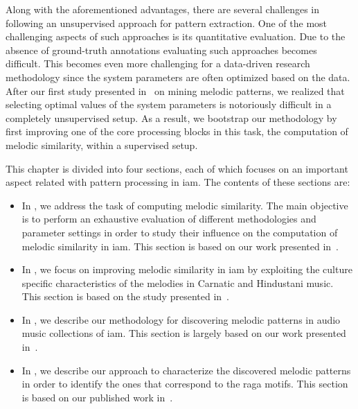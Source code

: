 Along with the aforementioned advantages, there are several challenges in following an unsupervised approach for pattern extraction. One of the most challenging aspects of such approaches is its quantitative evaluation. Due to the absence of ground-truth annotations evaluating such approaches becomes difficult. This becomes even more challenging for a data-driven research methodology since the system parameters are often optimized based on the data. After our first study presented in~\cite{gulati_SITIS_2014} on mining melodic patterns, we realized that selecting optimal values of the system parameters is notoriously difficult in a completely unsupervised setup. As a result, we bootstrap our methodology by first improving one of the core processing blocks in this task, the computation of melodic similarity, within a supervised setup. 

This chapter is divided into four sections, each of which focuses on an important aspect related with pattern processing in \gls{iam}. The contents of these sections are:
\begin{itemize}
	\item In , we address the task of computing melodic similarity. The main objective is to perform an exhaustive evaluation of different methodologies and parameter settings in order to study their influence on the computation of melodic similarity in \gls{iam}. This section is based on our work presented in~\cite{gulati_ICASSP2015}.
	\item In , we focus on improving melodic similarity in \gls{iam} by exploiting the culture specific characteristics of the melodies in Carnatic and Hindustani music. This section is based on the study presented in~\cite{gulati_ISMIR_2015}.
	\item In , we describe our methodology for discovering melodic patterns in audio music collections of \gls{iam}. This section is largely based on our work presented in~\cite{gulati_SITIS_2014}.
	\item In , we describe our approach to characterize the discovered melodic patterns in order to identify the ones that correspond to the \gls{raga} motifs. This section is based on our published work in~\cite{gulati_communities_2016}.
\end{itemize}




